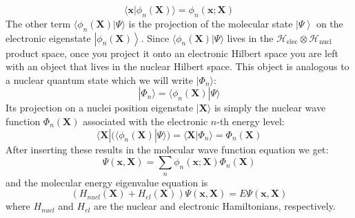 \documentclass[11pt,a4paper]{article}
\begin{document}
\begin{equation*}
	\langle\mathbf{x} | \phi_n(\mathbf{X})\rangle = \phi_n(\mathbf{x}; \mathbf{X})
\end{equation*}
The other term $\langle\phi_n(\mathbf{X}) | \Psi\rangle$ is the projection of the molecular state $\left|\Psi\right\rangle$ on the electronic eigenstate $\left|\phi_n(\mathbf{X})\right\rangle$. Since $\langle\phi_n(\mathbf{X}) | \Psi\rangle$ lives in the $\mathcal{H}_{\text{elec}} \otimes \mathcal{H}_{\text{nucl}}$ product space, once you project it onto an electronic Hilbert space you are left with an object that lives in the nuclear Hilbert space. This object is analogous to a nuclear quantum state which we will write $|\Phi_n\rangle$:
\begin{equation*}
	|\Phi_n\rangle = \langle\phi_n(\mathbf{X}) | \Psi\rangle
\end{equation*}
Its projection on a nuclei position eigenstate $|\mathbf{X}\rangle$ is simply the nuclear wave function $\Phi_n(\mathbf{X})$ associated with the electronic $n$-th energy level:
\begin{equation*}
	\langle\mathbf{X} | (\langle\phi_n(\mathbf{X}) | \Psi\rangle) = \langle\mathbf{X} | \Phi_n\rangle = \Phi_n(\mathbf{X}) 
\end{equation*}
After inserting these results in the molecular wave function equation we get:
\begin{equation*}
	\Psi(\mathbf{x}, \mathbf{X}) = \sum_n \phi_n(\mathbf{x}; \mathbf{X}) \Phi_n(\mathbf{X})
\end{equation*}
and the molecular energy eigenvalue equation is
\begin{equation}
	\label{eq:Molecular energy eigenvalue equation}
	(H_{nucl}(\mathbf{X}) + H_{el}(\mathbf{X})) \Psi(\mathbf{x}, \mathbf{X}) = E \Psi(\mathbf{x}, \mathbf{X})
\end{equation}
where $H_{nucl}$ and $H_{el}$ are the nuclear and electronic Hamiltonians, respectively.
\end{document}
